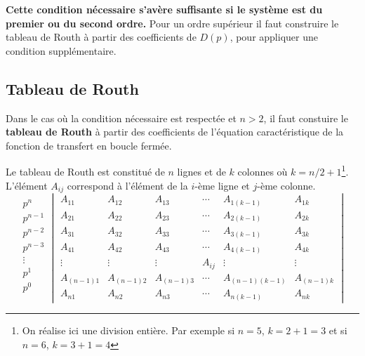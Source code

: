 \textbf{Cette condition nécessaire s'avère suffisante si le système est du 
premier ou du second ordre.} Pour un ordre supérieur il faut construire le 
tableau de Routh à partir des coefficients de $D(p)$,
pour appliquer une condition supplémentaire. 

\subsection{Tableau de Routh}
Dans le cas où la condition nécessaire est respectée et $n>2$, il faut 
constuire le \textbf{tableau de Routh} à partir des coefficients de l'équation 
caractéristique de la fonction de transfert en boucle fermée.

Le tableau de Routh est constitué de $n$ lignes et de $k$ colonnes 
où $k=n/2+1$\footnote{On réalise ici une division entière. Par exemple 
si $n=5$, $k=2+1=3$ et si $n=6$, $k=3+1=4$}. L'élément $A_{ij}$ correspond 
à l'élément de la $i$-ème ligne et $j$-ème colonne.
\[
\begin{matrix}
    p^n    \\
    p^{n-1}\\
    p^{n-2}\\
    p^{n-3}\\
    \vdots \\
    p^1    \\
    p^0    \\
\end{matrix}
\begin{vmatrix}
  A_{11}     & A_{12}     & A_{13}     & \cdots & A_{1(k-1)}     & A_{1k}  \\
  A_{21}     & A_{22}     & A_{23}     & \cdots & A_{2(k-1)}     & A_{2k}  \\
  A_{31}     & A_{32}     & A_{33}     & \cdots & A_{3(k-1)}     & A_{3k}  \\
  A_{41}     & A_{42}     & A_{43}     & \cdots & A_{4(k-1)}     & A_{4k}  \\
  \vdots     & \vdots     & \vdots     & A_{ij} & \vdots         & \vdots  \\
  A_{(n-1)1} & A_{(n-1)2} & A_{(n-1)3} & \cdots & A_{(n-1)(k-1)} & A_{(n-1)k}\\
  A_{n1}     & A_{n2}     & A_{n3}     & \cdots & A_{n(k-1)}     & A_{nk}
\end{vmatrix}
\]

